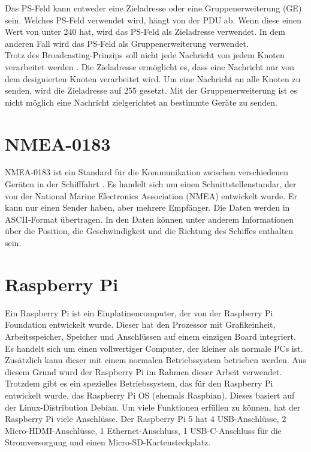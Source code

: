 Das PS-Feld kann entweder eine Zieladresse oder eine Gruppenerweiterung (GE) sein. Welches PS-Feld
verwendet wird, hängt von der PDU ab. Wenn diese einen Wert von unter 240 hat, wird das PS-Feld als Zieladresse verwendet. 
In dem anderen Fall wird das PS-Feld als Gruppenerweiterung verwendet. \\
Trotz des Broadcasting-Prinzips soll nicht jede Nachricht von jedem Knoten verarbeitet werden \cite{Murvay2018}.
Die Zieladresse ermöglicht es, dass eine Nachricht nur von dem designierten Knoten verarbeitet wird.
Um eine Nachricht an alle Knoten 
zu senden, wird die Zieladresse auf 255 gesetzt. Mit der Gruppenerweiterung ist es nicht möglich eine Nachricht 
zielgerichtet an bestimmte Geräte zu senden. 

\section{NMEA-0183}
NMEA-0183 ist ein Standard für die Kommunikation zwischen verschiedenen Geräten in der Schifffahrt \cite{nmea0183}. Es handelt sich um
einen Schnittstellenstandar, der von der National Marine Electronics Association (NMEA) entwickelt wurde. 
Er kann nur einen Sender haben, aber mehrere Empfänger. Die Daten werden in ASCII-Format übertragen. In den Daten 
können unter anderem Informationen über die Position, die Geschwindigkeit und die Richtung des Schiffes enthalten sein.

\section{Raspberry Pi} \label{sec:raspberrypi}
Ein Raspberry Pi ist ein Einplatinencomputer, der von der Raspberry Pi Foundation entwickelt wurde. 
Dieser hat den Prozessor mit Grafikeinheit, Arbeitsspeicher, Speicher und Anschlüssen auf einem einzigen Board integriert.
Es handelt sich um einen vollwertiger Computer, der kleiner als normale PCs ist. Zusätzlich kann dieser mit einem normalen Betriebssystem
betrieben werden. Aus diesem Grund wurd der Raspberry Pi im Rahmen dieser Arbeit verwendet.
Trotzdem gibt es ein spezielles Betriebssystem, das für den Raspberry Pi entwickelt wurde, das Raspberry Pi OS (ehemals Raspbian).
Dieses basiert auf der Linux-Distribution Debian. Um viele Funktionen erfüllen zu können, hat der Raspberry Pi viele Anschlüsse.
Der Raspberry Pi 5 hat 4 USB-Anschlüsse, 2 Micro-HDMI-Anschlüsse, 1 Ethernet-Anschluss, 1 USB-C-Anschluss 
für die Stromversorgung und einen Micro-SD-Kartensteckplatz.